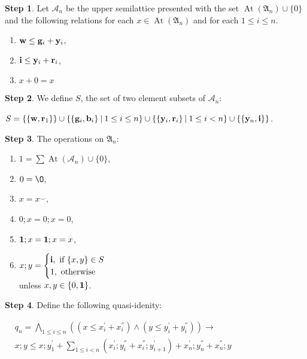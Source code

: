 \documentclass[a4paper]{article}
\theoremstyle{defin}
\theoremstyle{theorem}
\theoremstyle{prop}
\theoremstyle{lemma}
\theoremstyle{ex}
\theoremstyle{col}
\theoremstyle{claim}
\begin{document}
\vspace{\baselineskip}

{\bf Step 1}. Let $\mathcal{A}_n$ be the upper semilattice presented with the set $\operatorname{At}(\mathfrak{A}_n) \cup \{ 0 \}$ and the following relations for each $x \in \operatorname{At}(\mathfrak{A}_n)$ and for each $1 \leq i \leq n$.
\begin{enumerate}
  \item ${\bf w} \leq {\bf g}_i + {\bf y}_i$,
  \item ${\bf i} \leq {\bf y}_i + {\bf r}_i$,
  \item $x + 0 = x$
\end{enumerate}

{\bf Step 2}. We define $S$, the set of two element subsets of $\mathcal{A}_n$:
\begin{center}
  $S = \{ \{ {\bf w}, {\bf r}_1 \} \} \cup \{ \{ {\bf g}_i, {\bf b}_i \} \: | \: 1 \leq i \leq n \} \cup
  \{ \{ {\bf y}_i, {\bf r}_i \} \: | \: 1 \leq i < n \} \cup \{ \{ {\bf y}_n, {\bf i}\} \}$.
\end{center}

{\bf Step 3}. The operations on $\mathfrak{A}_n$:
\begin{enumerate}
  \item $1 = \sum \operatorname{At}(\mathcal{A}_n) \cup \{ 0 \}$,
  \item $0 = \O$,
  \item $x = x^{\smile}$,
  \item $0 ; x = 0 ; x = 0$,
  \item ${\bf 1} ; x = {\bf 1} ; x = x$,
  \item $x ; y = \begin{cases} {\bf i}, \text{ if $\{x, y\} \in S$} \\ 1, \text{ otherwise } \end{cases}$ \\ unless $x, y \in \{ 0, {\bf 1}\}$.
\end{enumerate}

{\bf Step 4}. Define the following quasi-idenity:
\begin{center}
  $\begin{array}{lll}
  & q_n = \bigwedge \limits_{1 \leq i \leq n} ( (x \leq x^{'}_i + x^{''}_i) \land (y \leq y^{'}_i + y^{''}_i)) \to & \\
  & x ; y \leq x ; y^{'}_1 + \sum \limits_{1 \leq i < n} (x^{'}_i ; y^{''}_i + x^{''}_i ; y^{'}_{i + 1}) + x^{'}_n ; y^{''}_n + x^{''}_n ; y&
  \end{array}$
\end{center}
\end{document}
